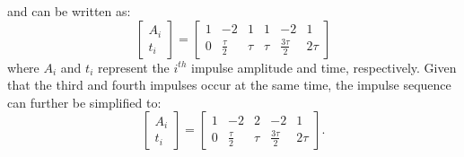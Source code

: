 %
and can be written as:
\begin{equation}
\begin{bmatrix}A_i \\t_i\end{bmatrix} = \begin{bmatrix}1 & -2 & 1 & 1 & -2 & 1 \\[3pt] 0 & \frac{\tau}{2} & \tau & \tau & \frac{3\tau}{2} & 2\tau \end{bmatrix}
\label{eqn:2x_bang_bang_eq}
\end{equation}
%
where $A_i$ and $t_i$ represent the $i^{th}$ impulse amplitude and time, respectively. Given that the third and fourth impulses occur at the same time, the impulse sequence can further be simplified to:
%
\begin{equation}
\begin{bmatrix}A_i \\t_i\end{bmatrix} = \begin{bmatrix}1 & -2 & 2 & -2 & 1 \\[3pt] 0 & \frac{\tau}{2} & \tau & \frac{3\tau}{2} & 2\tau \end{bmatrix}.
\label{eqn:2x_bang_bang_eq_simple}
\end{equation}
%

